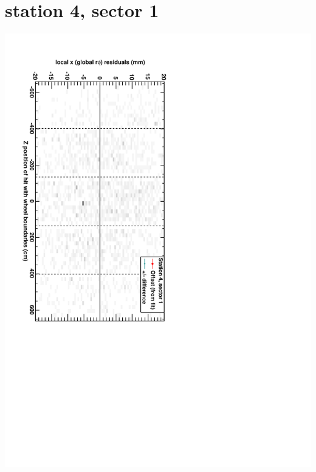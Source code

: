 \documentclass[compress]{beamer}
\begin{document}
\section*{station 4, sector 1}
\begin{frame} \vfill \mbox{\hspace{-1 cm}\includegraphics[height=1.2\linewidth, angle=90]{DTrphiVsZ_st4_sr01.pdf}} \end{frame}
\end{document}
